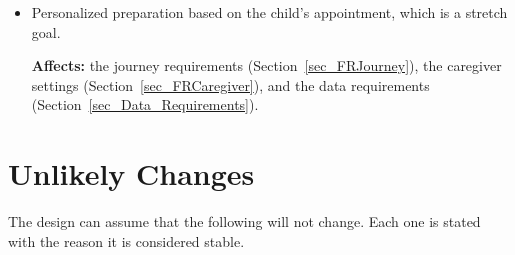 \documentclass[12pt]{article}
\newcommand{\nfrref}[1]{\hyperref[#1]{NFR\ref*{#1}}}
\newcounter{lcnum} %
\begin{document}
\begin{itemize}
\textbf{Affects:} the level requirements, \nfrref{NFR_Installability}, and the
Hazard Analysis.

\item[\refstepcounter{lcnum}\textbf{LC\thelcnum}\label{LC_Personalization}:]
Personalized preparation based on the child's appointment, which is a stretch
goal.

\textbf{Affects:} the journey requirements (Section~\ref{sec_FRJourney}), the
caregiver settings (Section~\ref{sec_FRCaregiver}), and the data requirements
(Section~\ref{sec_Data_Requirements}).

\end{itemize}

\section{Unlikely Changes}
\label{sec_UnlikelyChanges}

The design can assume that the following will not change. Each one is stated
with the reason it is considered stable.
\end{document}
